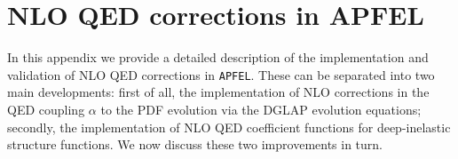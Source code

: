 \appendix

\section{NLO QED corrections in APFEL}
\label{sec:appendixAPFEL}

In this appendix we provide a detailed description of
the implementation and validation of NLO QED corrections
in {\tt APFEL}.
%
These can be separated into two main developments: first of all,
the implementation of NLO corrections in the QED coupling
$\alpha$ to the PDF evolution via the DGLAP evolution
equations; secondly, the implementation of NLO QED coefficient
functions for deep-inelastic structure functions.
%
We now discuss these two improvements in turn.

